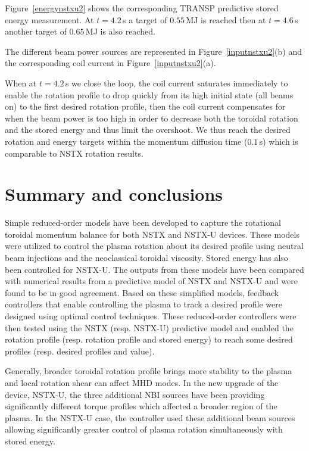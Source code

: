 \documentclass[12pt,lot, lof]{puthesis}
\begin{document}
Figure~\ref{energynstxu2} shows the corresponding TRANSP predictive stored energy measurement.
At $t = 4.2$\,s a target of $0.55$\,MJ is reached then at $t=4.6$\,s another target of $0.65$\,MJ is also reached.

The different beam power sources are represented in Figure~\ref{inputnstxu2}(b) and the corresponding coil current in Figure~\ref{inputnstxu2}(a).

When at $t = 4.2$\,s we close the loop, the coil current saturates immediately to enable the rotation profile to drop quickly from its high initial state (all beams on) to the first desired rotation profile, then the coil current compensates for when the beam power is too high in order to decrease both the toroidal rotation and the stored energy and thus limit the overshoot. We thus reach the desired rotation and energy targets within the momentum diffusion time ($0.1$\,s) which is comparable to NSTX rotation results.



\section{Summary and conclusions}

Simple reduced-order models have been developed to capture the rotational toroidal momentum balance for both NSTX and NSTX-U devices. These models were utilized to control the plasma rotation about its desired profile using neutral beam injections and the neoclassical toroidal viscosity. Stored energy has also been controlled for NSTX-U. The outputs from these models have been compared with numerical results from a predictive model of NSTX and NSTX-U and were found to be in good agreement. Based on these simplified models, feedback controllers that enable controlling the plasma to track a desired profile were designed using optimal control techniques. These reduced-order controllers were then tested using the NSTX (resp. NSTX-U) predictive model and enabled the rotation profile (resp. rotation profile and stored energy) to reach some desired profiles (resp. desired profiles and value).

Generally, broader toroidal rotation profile brings more stability to the plasma and local rotation shear can affect MHD modes. In the new upgrade of the device, NSTX-U, the three additional NBI sources have been providing significantly different torque profiles which affected a broader region of the plasma. In the NSTX-U case, the controller used these additional beam sources allowing significantly greater control of plasma rotation simultaneously with stored energy. 
\end{document}
